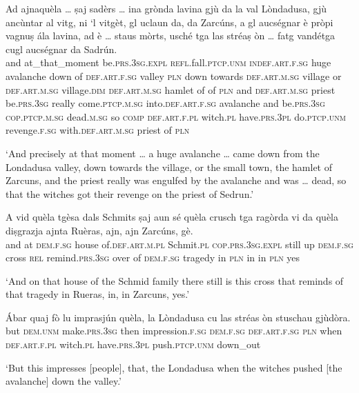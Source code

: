 \begin{linenumbers}
\gll    Ad ajnaquèla … ṣaj sadèrs … ina grònda lavina gjù da la val Lòndadusa, gjù ancùntar al vitg, ni `l vitgèt, gl uclaun da, da Zarcúns, a gl aucségnar è pròpi vagnuṣ ála lavina, ad è … staus mòrts, usché tga las stréaṣ òn … fatg vandétga cugl aucségnar da Sadrún.\\
and at\_that\_moment {} be.\textsc{prs.3sg.expl} \textsc{refl.}fall.\textsc{ptcp.unm} {} \textsc{indef.art.f.sg} huge avalanche down of \textsc{def.art.f.sg} valley \textsc{pln} down towards \textsc{def.art.m.sg} village or \textsc{def.art.m.sg} village.\textsc{dim} \textsc{def.art.m.sg} hamlet of of \textsc{pln} and \textsc{def.art.m.sg} priest be.\textsc{prs.3sg} really come.\textsc{ptcp.m.sg} into.\textsc{def.art.f.sg} avalanche and be.\textsc{prs.3sg} {} \textsc{cop.ptcp.m.sg} dead.\textsc{m.sg} so \textsc{comp} \textsc{def.art.f.pl} witch.\textsc{pl} have.\textsc{prs.3pl} {} do.\textsc{ptcp.unm} revenge.\textsc{f.sg} with.\textsc{def.art.m.sg} priest of \textsc{pln}\\
\end{linenumbers}
\medskip
\glt `And precisely at that moment … a huge avalanche … came down from the Londadusa valley, down towards the village, or the small town, the hamlet of Zarcuns, and the priest really was engulfed by the avalanche and was … dead, so that the witches got their revenge on the priest of Sedrun.'
\medskip

\begin{linenumbers}
\gll    A vid quèla tgèsa dals Schmits ṣaj aun sé quèla crusch tga ragòrda vi da quèla diṣgrazja ajnta Ruèras, ajn, ajn Zarcúns, gè.\\
and at \textsc{dem.f.sg} house of.\textsc{def.art.m.pl} Schmit.\textsc{pl} \textsc{cop.prs.3sg.expl} still up \textsc{dem.f.sg} cross \textsc{rel} remind.\textsc{prs.3sg} over of \textsc{dem.f.sg} tragedy in \textsc{pln} in in \textsc{pln} yes\\
\end{linenumbers}
\medskip
\glt `And on that house of the Schmid family there still is this cross that reminds of that tragedy in Rueras, in, in Zarcuns, yes.'
\medskip

\begin{linenumbers}
\gll    Ábar quaj fò lu imprasjún quèla, la Lòndadusa cu las stréas òn stuschau gjùdòra.\\
but \textsc{dem.unm} make.\textsc{prs.3sg} then impression.\textsc{f.sg} \textsc{dem.f.sg} \textsc{def.art.f.sg} \textsc{pln} when \textsc{def.art.f.pl} witch.\textsc{pl}  have.\textsc{prs.3pl} push.\textsc{ptcp.unm} down\_out\\
\end{linenumbers}
\medskip
\glt `But this impresses [people], that, the Londadusa when the witches pushed [the avalanche] down the valley.'
\medskip

